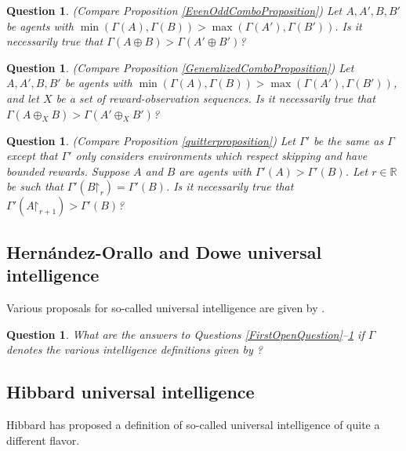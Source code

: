 \documentclass[twoside,11pt]{article}
\newtheorem{question}[theorem]{Question}
\begin{document}
\begin{question}
    (Compare Proposition \ref{EvenOddComboProposition})
    Let $A,A',B,B'$ be agents
    with $\min(\varGamma(A),\varGamma(B))>\max(\varGamma(A'),\varGamma(B'))$.
    Is it necessarily true that $\varGamma(A\oplus B)>\varGamma(A'\oplus B')$?
\end{question}

\begin{question}
    (Compare Proposition \ref{GeneralizedComboProposition})
    Let $A,A',B,B'$ be agents
    with $\min(\varGamma(A),\varGamma(B))>\max(\varGamma(A'),\varGamma(B'))$,
    and let $X$ be a set of reward-observation sequences.
    Is it necessarily true that $\varGamma(A\oplus_X B)>\varGamma(A'\oplus_X B')$?
\end{question}

\begin{question}
\label{LastOpenQuestion}
    (Compare Proposition \ref{quitterproposition})
    Let $\varGamma'$ be the same as $\varGamma$ except that $\varGamma'$ only considers
    environments which respect skipping and have bounded rewards.
    Suppose $A$ and $B$ are agents with $\varGamma'(A)>\varGamma'(B)$.
    Let $r\in\mathbb R$
    be such that $\varGamma'(B\mathord{\restriction}_{r})=\varGamma'(B)$.
    Is it necessarily true that
    $\varGamma'(A\mathord{\restriction}_{r+1})>\varGamma'(B)$?
\end{question}


\subsection{Hern\'andez-Orallo and Dowe universal intelligence}

Various proposals for so-called universal intelligence are given by \citet{hernandez}.

\begin{question}
    What are the answers to Questions \ref{FirstOpenQuestion}--\ref{LastOpenQuestion}
    if $\varGamma$ denotes the various intelligence definitions
    given by \citet{hernandez}?
\end{question}


\subsection{Hibbard universal intelligence}

Hibbard has proposed \citep{hibbard} a definition of so-called universal intelligence
of quite a different flavor.
\end{document}
